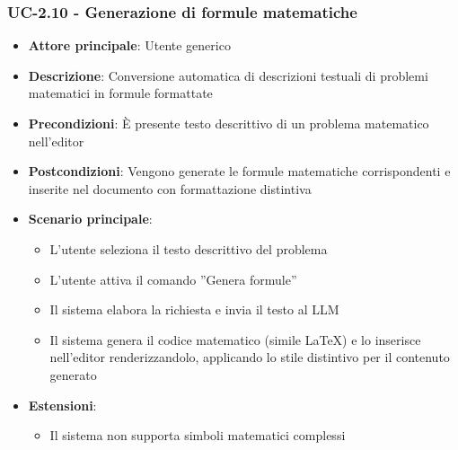 \documentclass[11pt,a4paper]{article}
\begin{document}
\subsubsection{UC-2.10 - Generazione di formule matematiche}
\begin{itemize}
    \item \textbf{Attore principale}: Utente generico
    \item \textbf{Descrizione}: Conversione automatica di descrizioni testuali di problemi matematici in formule formattate
    \item \textbf{Precondizioni}: È presente testo descrittivo di un problema matematico nell’editor
    \item \textbf{Postcondizioni}: Vengono generate le formule matematiche corrispondenti e inserite nel documento con formattazione distintiva
    \item \textbf{Scenario principale}:
    \begin{itemize}
    \item L’utente seleziona il testo descrittivo del problema
    \item L’utente attiva il comando ”Genera formule”
    \item Il sistema elabora la richiesta e invia il testo al LLM
    \item Il sistema genera il codice matematico (simile LaTeX) e lo inserisce nell'editor renderizzandolo, applicando lo stile distintivo per il contenuto generato
    \end{itemize}
    \item \textbf{Estensioni}:
    \begin{itemize}
        \item Il sistema non supporta simboli matematici complessi
    \end{itemize}
\end{itemize}
\end{document}
